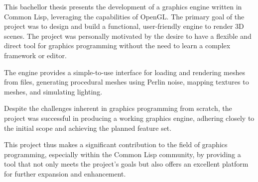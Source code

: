 This bachellor thesis presents the development of a graphics engine written in Common Lisp,
leveraging the capabilities of OpenGL.
The primary goal of the project was to design and build a functional,
user-friendly engine to render 3D scenes.
The project was personally motivated by the desire to have a flexible and direct tool for graphics programming without the need to learn a complex framework or editor.

The engine provides a simple-to-use interface for loading and rendering meshes from files,
generating procedural meshes using Perlin noise,
mapping textures to meshes,
and simulating lighting.

Despite the challenges inherent in graphics programming from scratch,
the project was successful in producing a working graphics engine,
adhering closely to the initial scope and achieving the planned feature set.

This project thus makes a significant contribution to the field of graphics programming,
especially within the Common Lisp community,
by providing a tool that not only meets the project's goals but also offers an excellent platform for further expansion and enhancement.
